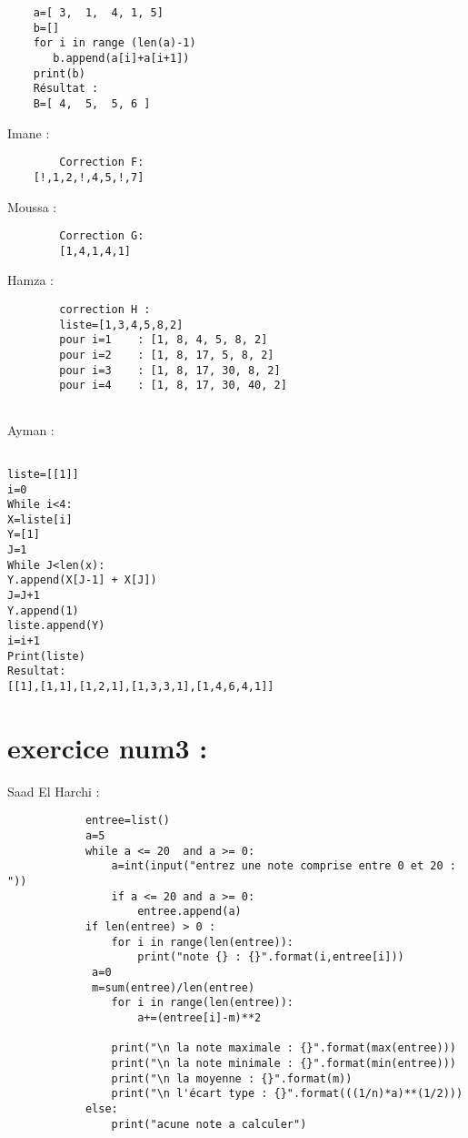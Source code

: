 \documentclass{article}
\begin{document}
	\begin{lstlisting}
    a=[ 3,  1,  4, 1, 5]
    b=[]
    for i in range (len(a)-1)
       b.append(a[i]+a[i+1])
    print(b)
    Résultat :
    B=[ 4,  5,  5, 6 ]
	\end{lstlisting}

	\begin{center}
    		Imane :
        \end{center} 
	
	\begin{lstlisting}
		Correction F:
	[!,1,2,!,4,5,!,7]

	\end{lstlisting}
	
    	\begin{center}
    		Moussa :
	\end{center} 
	
	\begin{lstlisting}
		Correction G:
		[1,4,1,4,1]
	\end{lstlisting}

    	\begin{center}
    		Hamza :
	\end{center} 
	\begin{lstlisting}
		correction H :
		liste=[1,3,4,5,8,2]
		pour i=1    : [1, 8, 4, 5, 8, 2]
		pour i=2    : [1, 8, 17, 5, 8, 2]
		pour i=3    : [1, 8, 17, 30, 8, 2]
		pour i=4    : [1, 8, 17, 30, 40, 2]
		
	\end{lstlisting}

	\begin{center}
    		Ayman :
	\end{center} 
	\begin{lstlisting}
	
liste=[[1]]
i=0
While i<4:
X=liste[i]
Y=[1]
J=1
While J<len(x):
Y.append(X[J-1] + X[J])
J=J+1
Y.append(1)
liste.append(Y)
i=i+1
Print(liste)
Resultat:
[[1],[1,1],[1,2,1],[1,3,3,1],[1,4,6,4,1]]
\end{lstlisting}
\section{exercice num3 :}
        \begin{center}
    		Saad El Harchi :
	\end{center}    	  
        	
    	\begin{lstlisting}
			entree=list()
			a=5
			while a <= 20  and a >= 0:
    			a=int(input("entrez une note comprise entre 0 et 20 : "))
    			if a <= 20 and a >= 0:
        			entree.append(a) 
			if len(entree) > 0 :
    			for i in range(len(entree)):
        			print("note {} : {}".format(i,entree[i]))
   			 a=0
   			 m=sum(entree)/len(entree)
    			for i in range(len(entree)):
        			a+=(entree[i]-m)**2
    
    			print("\n la note maximale : {}".format(max(entree)))
    			print("\n la note minimale : {}".format(min(entree)))
    			print("\n la moyenne : {}".format(m))
    			print("\n l'écart type : {}".format(((1/n)*a)**(1/2)))
			else:
    			print("acune note a calculer")
		\end{lstlisting}
\end{document}
